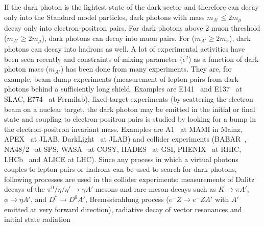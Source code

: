 \documentclass[../report.tex]{subfiles}
\begin{document}


If the dark photon is the lightest state of the dark sector 
and therefore can decay only into the Standard model particles, dark photons with mass $m_{A'} \le 2m_{\mu}$ decay only into electron-positron pairs. 
For dark photons above 2 muon threshold ($m_{A'} \ge 2m_{\mu}$), 
dark photons can decay into muon pairs. For ($m_{A'} \ge 2m_{\pi}$), 
dark photons can decay into hadrons as well. 
A lot of experimental activities have been seen recently 
and constraints of mixing parameter ($\epsilon^2$) as a function 
of dark photon mass ($m_{A'}$) has been done from many experiments. 
They are, for example, 
beam-dump experiments (measurement of lepton pairs from dark photons 
behind a sufficiently long shield. 
Examples are E141~\cite{Riordan:1987aw} and E137~\cite{Bjorken:1988as}
at SLAC, E774~\cite{Bross:1989mp} at Fermilab), 
fixed-target experiments (by scattering the electron beam on a nuclear target, 
the dark photon may be emitted in the initial or final state and coupling to 
electron-positron pairs is studied by looking for a bump in the 
electron-positron invariant mass. Examples are A1~\cite{Merkel:2014avp} 
at MAMI in Mainz, APEX~\cite{Abrahamyan:2011gv} at JLAB, 
DarkLight~\cite{Balewski:2013oza} at JLAB)
and collider experiments (BABAR~\cite{Lees:2014xha}, 
NA48/2~\cite{Batley:2015lha} at SPS, WASA~\cite{Moskal:2014dsa} at COSY, 
HADES~\cite{Agakishiev:2013fwl} at GSI, 
PHENIX~\cite{Adare:2014mgk} at RHIC, LHCb~\cite{Aaij:2017rft} and ALICE at LHC).
Since any process in which a virtual photons couples to lepton pairs or hadrons 
can be used to search for dark photons, 
following processes are used in the collider experiments: measurements of Dalitz decays of the $\pi^0/\eta/\eta' \rightarrow \gamma A'$ mesons and rare meson decays such as $K\rightarrow \pi A'$, $\phi \rightarrow \eta A'$, 
and $D^{*} \rightarrow D^{0}A'$,
Bremsstrahlung process 
($e^{-}Z \rightarrow e^{-}ZA'$ with $A'$ emitted at very forward direction),  
radiative decay of vector resonances and initial state radiation 
\end{document}
